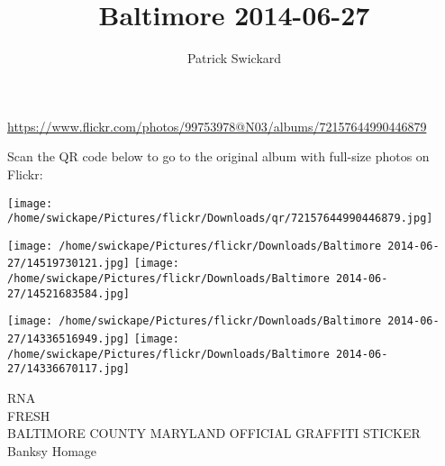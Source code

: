 \documentclass[10pt,letterpaper]{article}
\title{Baltimore 2014-06-27}
\author{Patrick Swickard}
\date{}
\begin{document}
\maketitle

\url{https://www.flickr.com/photos/99753978@N03/albums/72157644990446879}

Scan the QR code below to go to the original album with full-size photos on Flickr:

\texttt{[image: /home/swickape/Pictures/flickr/Downloads/qr/72157644990446879.jpg]}
\pagebreak

\texttt{[image: /home/swickape/Pictures/flickr/Downloads/Baltimore 2014-06-27/14519730121.jpg]}
\texttt{[image: /home/swickape/Pictures/flickr/Downloads/Baltimore 2014-06-27/14521683584.jpg]}

\texttt{[image: /home/swickape/Pictures/flickr/Downloads/Baltimore 2014-06-27/14336516949.jpg]}
\texttt{[image: /home/swickape/Pictures/flickr/Downloads/Baltimore 2014-06-27/14336670117.jpg]}

RNA\\
FRESH\\
BALTIMORE COUNTY MARYLAND OFFICIAL GRAFFITI STICKER\\
Banksy Homage
\pagebreak
\end{document}
